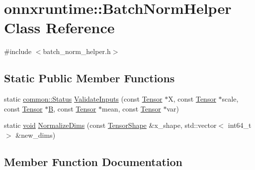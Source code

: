 \hypertarget{classonnxruntime_1_1BatchNormHelper}{}\section{onnxruntime\+:\+:Batch\+Norm\+Helper Class Reference}
\label{classonnxruntime_1_1BatchNormHelper}


{\ttfamily \#include $<$batch\+\_\+norm\+\_\+helper.\+h$>$}

\subsection*{Static Public Member Functions}
\begin{DoxyCompactItemize}
\item 
static \mbox{\hyperlink{classonnxruntime_1_1common_1_1Status}{common\+::\+Status}} \mbox{\hyperlink{classonnxruntime_1_1BatchNormHelper_a21bb103bcaf585134f58764ae1bad7dd}{Validate\+Inputs}} (const \mbox{\hyperlink{classonnxruntime_1_1Tensor}{Tensor}} $\ast$X, const \mbox{\hyperlink{classonnxruntime_1_1Tensor}{Tensor}} $\ast$scale, const \mbox{\hyperlink{classonnxruntime_1_1Tensor}{Tensor}} $\ast$\mbox{\hyperlink{mlasi_8h_a472f4360dfbf830e5135980ff43484b9}{B}}, const \mbox{\hyperlink{classonnxruntime_1_1Tensor}{Tensor}} $\ast$mean, const \mbox{\hyperlink{classonnxruntime_1_1Tensor}{Tensor}} $\ast$var)
\item 
static \mbox{\hyperlink{mlasi_8h_a88f941d423cb2a819b70a1358982b1a6}{void}} \mbox{\hyperlink{classonnxruntime_1_1BatchNormHelper_a9422bf5b6ed1096bb08569130ae39366}{Normalize\+Dims}} (const \mbox{\hyperlink{classonnxruntime_1_1TensorShape}{Tensor\+Shape}} \&x\+\_\+shape, std\+::vector$<$ int64\+\_\+t $>$ \&new\+\_\+dims)
\end{DoxyCompactItemize}


\subsection{Member Function Documentation}
\mbox{\label{classonnxruntime_1_1BatchNormHelper_a9422bf5b6ed1096bb08569130ae39366}} 
